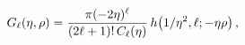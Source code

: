 \[\mathop{G_{\ell}\/}\nolimits\!\left(\eta,\rho\right)=\dfrac{\pi(-2\eta)^{\ell}%
}{(2\ell+1)!\mathop{C_{\ell}\/}\nolimits\!\left(\eta\right)}\mathop{h\/}%
\nolimits\!\left(1/\eta^{2},\ell;-\eta\rho\right),\]